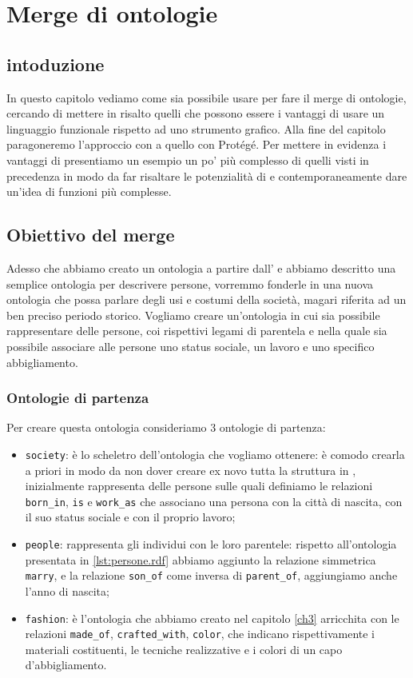 \chapter{Merge di ontologie}
\label{ch4}
\section*{intoduzione}
In questo capitolo vediamo come sia possibile usare \cduce per fare il merge di ontologie, cercando di mettere in risalto quelli che possono essere i vantaggi di usare un linguaggio funzionale rispetto ad uno strumento grafico. Alla fine del capitolo paragoneremo l'approccio con \cduce a quello con Protégé. Per mettere in evidenza i vantaggi di \cduce presentiamo un esempio un po' più complesso di quelli visti in precedenza in modo da far risaltare le potenzialità di \cduce e contemporaneamente dare un'idea di funzioni più complesse.

\section{Obiettivo del merge}\label{ch4.1}
Adesso che abbiamo creato un ontologia a partire dall' e abbiamo descritto una semplice ontologia per descrivere persone, vorremmo fonderle in una nuova ontologia che possa parlare degli usi e costumi della società, magari riferita ad un ben preciso periodo storico. Vogliamo creare un'ontologia in cui sia possibile rappresentare delle persone, coi rispettivi legami di parentela e nella quale sia possibile associare alle persone uno status sociale, un lavoro e uno specifico abbigliamento.
\subsection{Ontologie di partenza}
Per creare questa ontologia consideriamo 3 ontologie di partenza:
\begin{itemize}
	\item \verb|society|: è lo scheletro dell'ontologia che vogliamo ottenere: è comodo crearla a priori in modo da non dover creare ex novo tutta la struttura in \cduce\hspace{-.1cm}, inizialmente rappresenta delle persone sulle quali definiamo le relazioni \verb|born_in|, \verb|is| e \verb|work_as| che associano una persona con la città di nascita, con il suo status sociale e con il proprio lavoro;
	\item \verb|people|: rappresenta gli individui con le loro parentele: rispetto all'ontologia presentata in \ref{lst:persone.rdf} abbiamo aggiunto la relazione simmetrica \verb|marry|, e la relazione \verb|son_of| come inversa di \verb|parent_of|, aggiungiamo anche l'anno di nascita;
	\label{ont_fashion}
	\item \verb|fashion|: è l'ontologia che abbiamo creato nel capitolo \ref{ch3} arricchita con le relazioni \verb|made_of|, \verb|crafted_with|, \verb|color|, che indicano rispettivamente i materiali costituenti, le tecniche realizzative e i colori di un capo d'abbigliamento.
\end{itemize}
